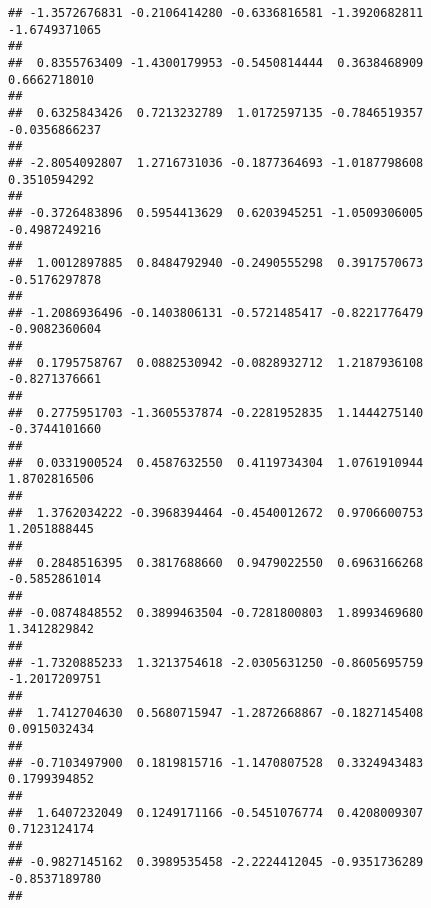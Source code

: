 \documentclass[]{article}
\begin{document}
\begin{verbatim}
## -1.3572676831 -0.2106414280 -0.6336816581 -1.3920682811 -1.6749371065 
##                                                                       
##  0.8355763409 -1.4300179953 -0.5450814444  0.3638468909  0.6662718010 
##                                                                       
##  0.6325843426  0.7213232789  1.0172597135 -0.7846519357 -0.0356866237 
##                                                                       
## -2.8054092807  1.2716731036 -0.1877364693 -1.0187798608  0.3510594292 
##                                                                       
## -0.3726483896  0.5954413629  0.6203945251 -1.0509306005 -0.4987249216 
##                                                                       
##  1.0012897885  0.8484792940 -0.2490555298  0.3917570673 -0.5176297878 
##                                                                       
## -1.2086936496 -0.1403806131 -0.5721485417 -0.8221776479 -0.9082360604 
##                                                                       
##  0.1795758767  0.0882530942 -0.0828932712  1.2187936108 -0.8271376661 
##                                                                       
##  0.2775951703 -1.3605537874 -0.2281952835  1.1444275140 -0.3744101660 
##                                                                       
##  0.0331900524  0.4587632550  0.4119734304  1.0761910944  1.8702816506 
##                                                                       
##  1.3762034222 -0.3968394464 -0.4540012672  0.9706600753  1.2051888445 
##                                                                       
##  0.2848516395  0.3817688660  0.9479022550  0.6963166268 -0.5852861014 
##                                                                       
## -0.0874848552  0.3899463504 -0.7281800803  1.8993469680  1.3412829842 
##                                                                       
## -1.7320885233  1.3213754618 -2.0305631250 -0.8605695759 -1.2017209751 
##                                                                       
##  1.7412704630  0.5680715947 -1.2872668867 -0.1827145408  0.0915032434 
##                                                                       
## -0.7103497900  0.1819815716 -1.1470807528  0.3324943483  0.1799394852 
##                                                                       
##  1.6407232049  0.1249171166 -0.5451076774  0.4208009307  0.7123124174 
##                                                                       
## -0.9827145162  0.3989535458 -2.2224412045 -0.9351736289 -0.8537189780 
##                                                                       

\end{verbatim}
\end{document}
